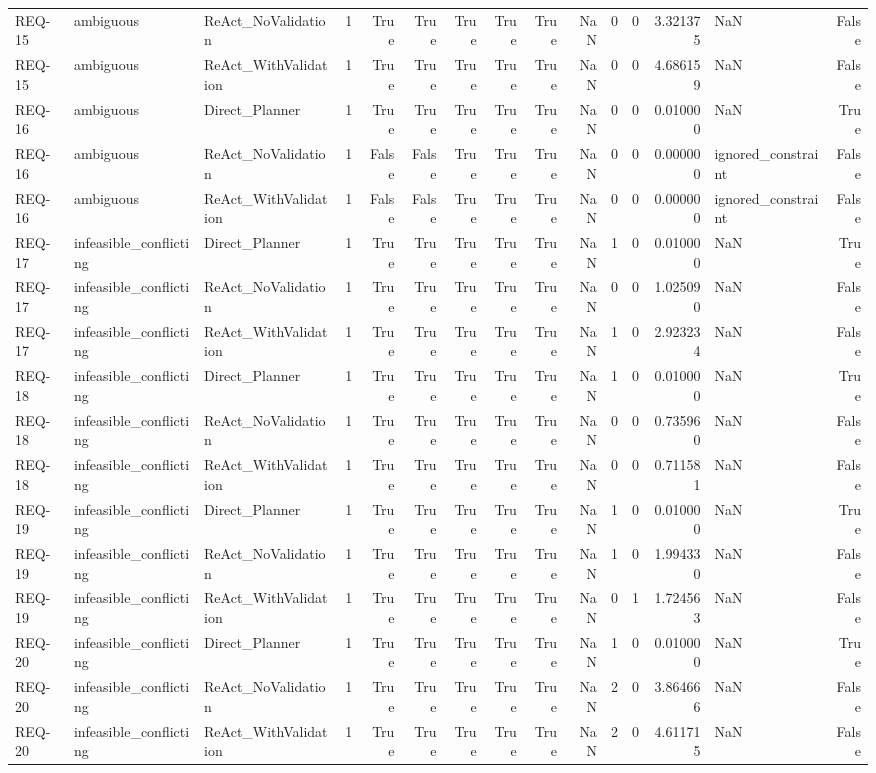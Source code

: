 \begin{table}[htbp]
\begin{tabular}{lllrrrrrrrrrrlr}
REQ-15 & ambiguous & ReAct\_NoValidation & 1 & True & True & True & True & True & NaN & 0 & 0 & 3.321375 & NaN & False \\
REQ-15 & ambiguous & ReAct\_WithValidation & 1 & True & True & True & True & True & NaN & 0 & 0 & 4.686159 & NaN & False \\
REQ-16 & ambiguous & Direct\_Planner & 1 & True & True & True & True & True & NaN & 0 & 0 & 0.010000 & NaN & True \\
REQ-16 & ambiguous & ReAct\_NoValidation & 1 & False & False & True & True & True & NaN & 0 & 0 & 0.000000 & ignored\_constraint & False \\
REQ-16 & ambiguous & ReAct\_WithValidation & 1 & False & False & True & True & True & NaN & 0 & 0 & 0.000000 & ignored\_constraint & False \\
REQ-17 & infeasible\_conflicting & Direct\_Planner & 1 & True & True & True & True & True & NaN & 1 & 0 & 0.010000 & NaN & True \\
REQ-17 & infeasible\_conflicting & ReAct\_NoValidation & 1 & True & True & True & True & True & NaN & 0 & 0 & 1.025090 & NaN & False \\
REQ-17 & infeasible\_conflicting & ReAct\_WithValidation & 1 & True & True & True & True & True & NaN & 1 & 0 & 2.923234 & NaN & False \\
REQ-18 & infeasible\_conflicting & Direct\_Planner & 1 & True & True & True & True & True & NaN & 1 & 0 & 0.010000 & NaN & True \\
REQ-18 & infeasible\_conflicting & ReAct\_NoValidation & 1 & True & True & True & True & True & NaN & 0 & 0 & 0.735960 & NaN & False \\
REQ-18 & infeasible\_conflicting & ReAct\_WithValidation & 1 & True & True & True & True & True & NaN & 0 & 0 & 0.711581 & NaN & False \\
REQ-19 & infeasible\_conflicting & Direct\_Planner & 1 & True & True & True & True & True & NaN & 1 & 0 & 0.010000 & NaN & True \\
REQ-19 & infeasible\_conflicting & ReAct\_NoValidation & 1 & True & True & True & True & True & NaN & 1 & 0 & 1.994330 & NaN & False \\
REQ-19 & infeasible\_conflicting & ReAct\_WithValidation & 1 & True & True & True & True & True & NaN & 0 & 1 & 1.724563 & NaN & False \\
REQ-20 & infeasible\_conflicting & Direct\_Planner & 1 & True & True & True & True & True & NaN & 1 & 0 & 0.010000 & NaN & True \\
REQ-20 & infeasible\_conflicting & ReAct\_NoValidation & 1 & True & True & True & True & True & NaN & 2 & 0 & 3.864666 & NaN & False \\
REQ-20 & infeasible\_conflicting & ReAct\_WithValidation & 1 & True & True & True & True & True & NaN & 2 & 0 & 4.611715 & NaN & False \\
\bottomrule
\end{tabular}

\end{table}

